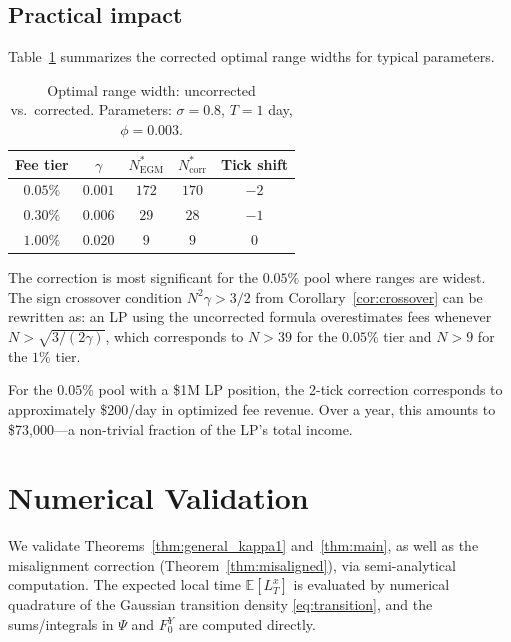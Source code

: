 \documentclass[11pt]{article}
\theoremstyle{definition}
\theoremstyle{remark}
\newcommand{\E}{\mathbb{E}}
\begin{document}
\subsection{Practical impact}

Table~\ref{tab:optimal_N} summarizes the corrected optimal range
widths for typical parameters.

\begin{table}[h]
\centering
\caption{Optimal range width: uncorrected vs.\ corrected. Parameters:
$\sigma = 0.8$, $T = 1$ day, $\phi = 0.003$.}
\label{tab:optimal_N}
\begin{tabular}{ccccc}
\toprule
Fee tier & $\gamma$ & $N^*_{\mathrm{EGM}}$
& $N^*_{\mathrm{corr}}$ & Tick shift \\
\midrule
$0.05\%$ & $0.001$ & $172$ & $170$ & $-2$ \\
$0.30\%$ & $0.006$ & $29$ & $28$ & $-1$ \\
$1.00\%$ & $0.020$ & $9$ & $9$ & $0$ \\
\bottomrule
\end{tabular}
\end{table}

The correction is most significant for the $0.05\%$ pool where
ranges are widest. The sign crossover condition $N^2\gamma > 3/2$
from Corollary~\ref{cor:crossover} can be rewritten as: an LP
using the uncorrected formula overestimates fees whenever
$N > \sqrt{3/(2\gamma)}$, which corresponds to
$N > 39$ for the $0.05\%$ tier and $N > 9$ for the $1\%$
tier.

For the $0.05\%$ pool with a \$1M LP position, the 2-tick correction
corresponds to approximately \$200/day in optimized fee revenue. Over
a year, this amounts to \$73{,}000---a non-trivial fraction of the
LP's total income.

\section{Numerical Validation}\label{sec:numerics}

We validate Theorems~\ref{thm:general_kappa1} and~\ref{thm:main},
as well as the misalignment correction
(Theorem~\ref{thm:misaligned}), via semi-analytical computation.
The expected local time $\E[L^x_T]$ is evaluated by numerical
quadrature of the Gaussian transition density
\eqref{eq:transition}, and the sums/integrals in $\Psi$ and
$F_0^Y$ are computed directly.
\end{document}

